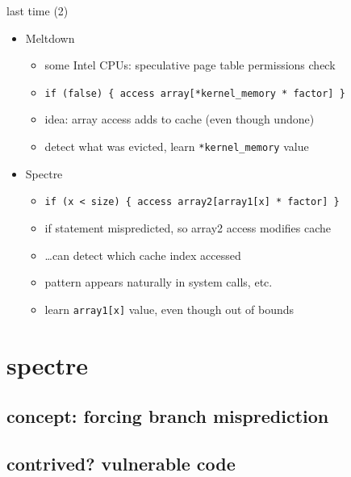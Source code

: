 \begin{frame}[fragile]{last time (2)}
    \begin{itemize}
    \item Meltdown 
        \begin{itemize}
        \item some Intel CPUs: speculative page table permissions check
        \item \verb|if (false) { access array[*kernel_memory * factor] }|
        \item idea: array access adds to cache (even though undone)
        \item detect what was evicted, learn \verb|*kernel_memory| value
        \end{itemize}
    \item Spectre
        \begin{itemize}
        \item \verb|if (x < size) { access array2[array1[x] * factor] }|
        \item if statement mispredicted, so array2 access modifies cache
        \item \ldots can detect which cache index accessed
        \item pattern appears naturally in system calls, etc.
        \item learn \verb|array1[x]| value, even though out of bounds
        \end{itemize}
    \end{itemize}
\end{frame}

\section{spectre}











\subsection{concept: forcing branch misprediction}


\subsection{contrived? vulnerable code}


